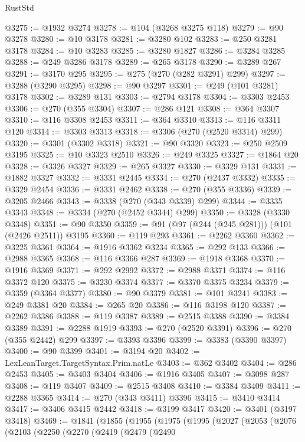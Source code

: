 \begin{lexlean}{RustStd}
\begin{coremodule}
@3275 := @1932 @3274
@3278 := @104 (@3268 @3275 @118)
@3279 := @90 @3278
@3280 := @10 @3178
@3281 := @3280 @102
@3283 := @250 @3281 @3178
@3284 := @10 @3283
@3285 := @3280 @1827
@3286 := @3284 @3285
@3288 := @249 @3286 @3178
@3289 := @265 @3178
@3290 := @3289 @267
@3291 := @3170 @295
@3295 := @275 (@270 (@282 @3291) @299)
@3297 := @3288 (@3290 @3295)
@3298 := @90 @3297
@3301 := @249 (@101 @3281) @3178
@3302 := @3289 @131
@3303 := @2794 @3178
@3304 := @3303 @2453
@3306 := @270 (@355 @3304)
@3307 := @286 @121
@3308 := @364 @3307
@3310 := @116 @3308 @2453
@3311 := @364 @3310
@3313 := @116 @3311 @120
@3314 := @3303 @3313
@3318 := @3306 (@270 (@2520 @3314) @299)
@3320 := @3301 (@3302 @3318)
@3321 := @90 @3320
@3323 := @250 @2509 @3195
@3325 := @10 @3323 @2510
@3326 := @249 @3325
@3327 := @1864 @20
@3328 := @3326 @3327
@3329 := @265 @3327
@3330 := @3329 @131
@3331 := @1882 @3327
@3332 := @3331 @2445
@3334 := @270 (@2437 @3332)
@3335 := @3329 @2454
@3336 := @3331 @2462
@3338 := @270 (@355 @3336)
@3339 := @3205 @2466
@3343 := @3338 (@270 (@343 @3339) @299)
@3344 := @3335 @3343
@3348 := @3334 (@270 (@2452 @3344) @299)
@3350 := @3328 (@3330 @3348)
@3351 := @90 @3350
@3359 := @91 (@97 (@244 (@245 @281))) (@101 (@2426 @2511)) @3195
@3360 := @119 @293
@3361 := @2262 @3360
@3362 := @3225 @3361
@3364 := @1916 @3362 @3234
@3365 := @292 @133
@3366 := @2988 @3365
@3368 := @116 @3366 @287
@3369 := @1918 @3368
@3370 := @1916 @3369
@3371 := @292 @2992
@3372 := @2988 @3371
@3374 := @116 @3372 @120
@3375 := @3230 @3374
@3377 := @3370 @3375 @3234
@3379 := @3359 (@3364 @3377)
@3380 := @90 @3379
@3381 := @101 @3241
@3383 := @249 @3381 @20
@3384 := @265 @20
@3386 := @116 @3198 @120
@3387 := @2262 @3386
@3388 := @119 @3387
@3389 := @2515 @3388
@3390 := @3384 @3389
@3391 := @2288 @1919
@3393 := @270 (@2520 @3391)
@3396 := @270 (@355 @2442) @299
@3397 := @3393 @3396
@3399 := @3383 (@3390 @3397)
@3400 := @90 @3399
@3401 := @3194 @20
@3402 := LexLeanTarget.TargetSyntax.Prim.natLe
@3403 := @362 @3402
@3404 := @286 @2453
@3405 := @3403 @3404
@3406 := @1916 @3405
@3407 := @3098 @287
@3408 := @119 @3407
@3409 := @2515 @3408
@3410 := @3384 @3409
@3411 := @2288 @3365
@3414 := @270 (@343 @3411) @3396
@3415 := @3410 @3414
@3417 := @3406 @3415 @2442
@3418 := @3199 @3417
@3420 := @3401 (@3197 @3418)
@3469 := @1841
    (@1855
      (@1955
        (@1975
          (@1995
            (@2027
              (@2053
                (@2076
                  (@2103
                    (@2250
                      (@2270
                        (@2419
                          (@2479
                            (@2490

\end{coremodule}
\end{lexlean}
